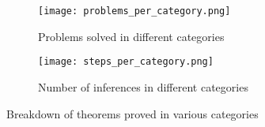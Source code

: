 \begin{figure}
\begin{subfigure}{.5\textwidth}
  \centering
  \texttt{[image: problems\_per\_category.png]}
  \caption{Problems solved in different categories}
  \label{fig:problems-per-category-miniF2F}
\end{subfigure}\begin{subfigure}{.5\textwidth}
  \centering
  \texttt{[image: steps\_per\_category.png]}
  \caption{Number of inferences in different categories}
  \label{fig:steps-per-category-miniF2F}
\end{subfigure}
\caption{Breakdown of theorems proved in various categories}
\label{fig:problem-category-miniF2F}
\vspace{-0.2in}
\end{figure}
